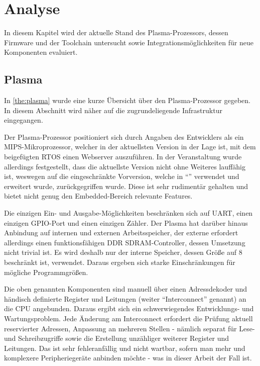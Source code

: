 \chapter{Analyse}
\label{cha:analysis}

In diesem Kapitel wird der aktuelle Stand des Plasma-Prozessors, dessen Firmware und der Toolchain untersucht sowie Integrationsmöglichkeiten für neue Komponenten evaluiert. 

\section{Plasma}
\label{ana:plasma}

In \cref{the:plasma} wurde eine kurze Übersicht über den Plasma-Prozessor gegeben. In diesem Abschnitt wird näher auf die zugrundeliegende Infrastruktur eingegangen. 

Der Plasma-Prozessor positioniert sich durch Angaben des Entwicklers als ein \gls{MIPS}-Mikroprozessor, welcher in der aktuellsten Version in der Lage ist, mit dem beigefügten \gls{RTOS} einen Webserver auszuführen. In der Veranstaltung \textit{\subjectphv{}} wurde allerdings festgestellt, dass die aktuellste Version nicht ohne Weiteres lauffähig ist, weswegen auf die eingeschränkte Vorversion, welche in \enquote{\subjectphv{}} verwendet und erweitert wurde, zurückgegriffen wurde. Diese ist sehr rudimentär gehalten und bietet nicht genug den Embedded-Bereich relevante Features. 

Die einzigen Ein- und Ausgabe-Möglichkeiten beschränken sich auf \gls{UART}, einen einzigen \gls{GPIO}-Port und einen einzigen Zähler. Der Plasma hat darüber hinaus Anbindung auf internen und externen Arbeitsspeicher, der externe erfordert allerdings einen funktionsfähigen \gls{DDR SDRAM}-Controller, dessen Umsetzung nicht trivial ist. Es wird deshalb nur der interne Speicher, dessen Größe auf \SI{8}{\kilo\byte} beschränkt ist, verwendet. Daraus ergeben sich starke Einschränkungen für mögliche Programmgrößen.

Die oben genannten Komponenten sind manuell über einen Adressdekoder und händisch definierte Register und Leitungen (weiter \enquote{\gls{Interconnect}} genannt) an die \gls{CPU} angebunden. Daraus ergibt sich ein schwerwiegendes Entwicklungs- und Wartungsproblem. Jede Änderung am \gls{Interconnect} erfordert die Prüfung aktuell reservierter Adressen, Anpassung an mehreren Stellen - nämlich separat für Lese- und Schreibzugriffe sowie die Erstellung unzähliger weiterer Register und Leitungen. Das ist sehr fehleranfällig und nicht wartbar, sofern man mehr und komplexere Peripheriegeräte anbinden möchte - was in dieser Arbeit der Fall ist.

